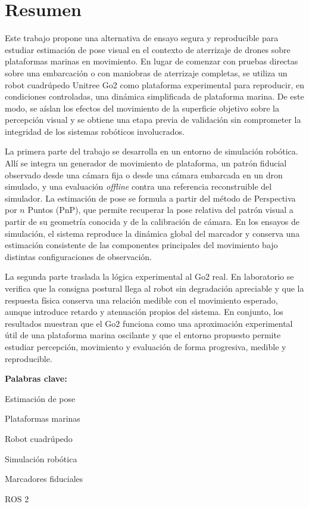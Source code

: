\documentclass[12pt,a4paper]{report}
\begin{document}

\chapter*{Resumen}
Este trabajo propone una alternativa de ensayo segura y reproducible para
estudiar estimación de pose visual en el contexto de aterrizaje de drones sobre
plataformas marinas en movimiento. En lugar de comenzar con pruebas directas
sobre una embarcación o con maniobras de aterrizaje completas, se utiliza un
robot cuadrúpedo Unitree Go2 como plataforma experimental para reproducir, en
condiciones controladas, una dinámica simplificada de plataforma marina. De este
modo, se aíslan los efectos del movimiento de la superficie objetivo sobre la
percepción visual y se obtiene una etapa previa de validación sin comprometer la
integridad de los sistemas robóticos involucrados.

La primera parte del trabajo se desarrolla en un entorno de simulación robótica.
Allí se integra un generador de movimiento de plataforma, un patrón fiducial
observado desde una cámara fija o desde una cámara embarcada en un dron
simulado, y una evaluación \textit{offline} contra una referencia reconstruible
del simulador. La estimación de pose se formula a partir del método de
Perspectiva por \(n\) Puntos (PnP), que
permite recuperar la pose relativa del patrón visual a partir de su geometría
conocida y de la calibración de cámara. En los ensayos de simulación, el sistema
reproduce la dinámica global del marcador y conserva una estimación consistente
de las componentes principales del movimiento bajo distintas configuraciones de
observación.

La segunda parte traslada la lógica experimental al Go2 real. En laboratorio se
verifica que la consigna postural llega al robot sin degradación apreciable y
que la respuesta física conserva una relación medible con el movimiento
esperado, aunque introduce retardo y atenuación propios del sistema. En
conjunto, los resultados muestran que el Go2 funciona como una aproximación
experimental útil de una plataforma marina oscilante y que el entorno propuesto
permite estudiar percepción, movimiento y evaluación de forma progresiva,
medible y reproducible.

\vspace{2cm}
\noindent\textbf{Palabras clave:}
\begin{itemize*}[label={}, afterlabel={}, itemjoin={;\space}]
    \item Estimación de pose
    \item Plataformas marinas
    \item Robot cuadrúpedo
    \item Simulación robótica
    \item Marcadores fiduciales
    \item ROS 2
\end{itemize*}
\newpage
\end{document}
